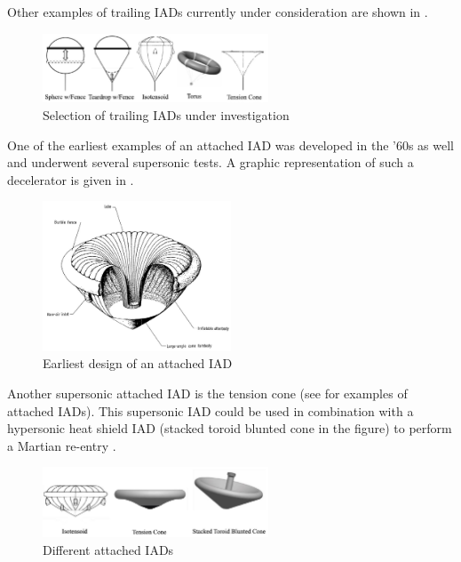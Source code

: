 Other examples of trailing \acs{IAD}s currently under consideration are shown in .

\begin{figure}[!ht]
\centering
\includegraphics[width=0.6\textwidth]{figures/entry_descent/trailingiad_mooij2013para.jpg}
\caption{Selection of trailing \acs{IAD}s under investigation \cite{mooij2013para,witkowski2006}}
\label{fig:trailingiad_mooij2013para}
\end{figure} 

One of the earliest examples of an attached \acs{IAD} was developed in the '60s as well \cite{deveikis1970} and underwent several supersonic tests. A graphic representation of such a decelerator is given in . 

\begin{figure}[!ht]
\centering
\includegraphics[width=0.5\textwidth]{figures/entry_descent/attachediad_deveikis1970.jpg}
\caption{Earliest design of an attached \acs{IAD} \cite{deveikis1970}}
\label{fig:attachediad_deveikis1970}
\end{figure}

Another supersonic attached \acs{IAD} is the tension cone \cite{clark2009,steinfeldt2006} (see  for examples of attached \acs{IAD}s). This supersonic \acs{IAD} could be used in combination with a hypersonic heat shield \acs{IAD} (stacked toroid blunted cone in the figure) to perform a Martian re-entry \cite{sostaric2010}. 

\begin{figure}[!ht]
\centering
\includegraphics[width=0.6\textwidth]{figures/entry_descent/attachediad_mooij2013para.jpg}
\caption{Different attached \acs{IAD}s\cite{mooij2013para}}
\label{fig:attachediad_mooij2013para}
\end{figure}

